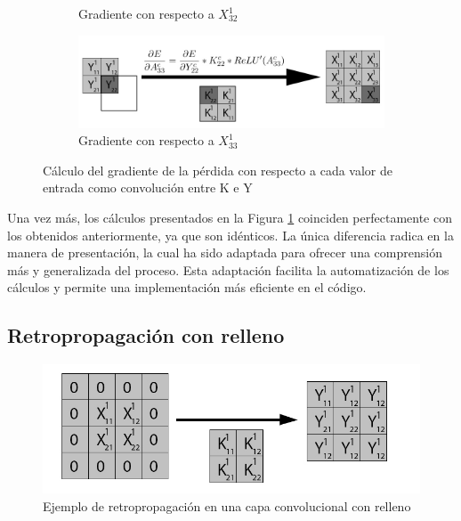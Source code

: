 \begin{figure}[H]
\begin{subfigure}{.5\textwidth}
		\caption{Gradiente con respecto a $X^1_{32}$}
	\end{subfigure}
		\vspace{5mm}
	\begin{subfigure}{.5\textwidth}
		\hspace{-25mm}
		\includegraphics[width=1.4\linewidth]{imagenes/conv_back_entrada_9.jpg}  
		\caption{Gradiente con respecto a $X^1_{33}$}
	\end{subfigure}
	\caption{Cálculo del gradiente de la pérdida con respecto a cada valor de entrada como convolución entre K e Y}
	\label{fig:conv_backprop_como_convolucion_Y_W}
\end{figure}

Una vez más, los cálculos presentados en la Figura \ref{fig:conv_backprop_como_convolucion_Y_W} coinciden perfectamente con los obtenidos anteriormente, ya que son idénticos. La única diferencia radica en la manera de presentación, la cual ha sido adaptada para ofrecer una comprensión más y generalizada del proceso. Esta adaptación facilita la automatización de los cálculos y permite una implementación más eficiente en el código.

\subsection{Retropropagación con relleno}

\begin{figure}[H]
	\centering
	\includegraphics[width=0.8\linewidth]{imagenes/conv_back_padding_intro.jpg} 
	\caption{Ejemplo de retropropagación en una capa convolucional con relleno}
	\label{fig:conv_back_padding_intro}
\end{figure}

